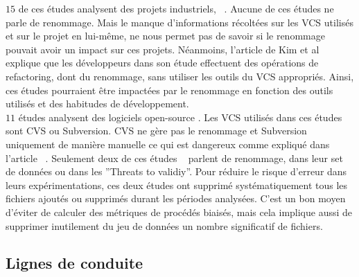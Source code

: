 $15$ de ces études analysent des projets industriels, ~\cite{arisholm_systematic_2010,graves_predicting_2000,khoshgoftaar_using_2000,layman_iterative_2008,munson_code_1998,nagappan_use_2005,nagappan_influence_2008,nagappan_using_2007,nagappan_using_2006,nagappan_change_2010,nikora_building_2006,ostrand_programmer-based_2010,weyuker_too_2008,weyuker_using_2007,yuan_application_2000}. Aucune de ces études ne parle de renommage. Mais le manque d'informations récoltées sur les VCS utilisés et sur le projet en lui-même, ne nous permet pas de savoir si le renommage pouvait avoir un impact sur ces projets. Néanmoins, l'article de Kim et al ~\cite{kim_field_2012} explique que les développeurs dans son étude effectuent des opérations de refactoring, dont du renommage, sans utiliser les outils du VCS appropriés. Ainsi, ces études pourraient être impactées par le renommage en fonction des outils utilisés et des habitudes de développement.\\

$11$ études analysent des logiciels open-source \cite{dambros_relationship_2009,bacchelli_are_2010,caglayan_merits_2009,dambros_evaluating_2012,dambros_evaluating_2012,dambros_extensive_2010,illes-seifert_exploring_2010,li_finding_2005,matsumoto_analysis_2010,moser_analysis_2008,moser_comparative_2008,schroter_if_2006}. Les VCS utilisés dans ces études sont CVS ou Subversion. CVS ne gère pas le renommage et Subversion uniquement de manière manuelle ce qui est dangereux comme expliqué dans l'article ~\cite{lavoie_inferring_2012,steidl_incremental_2014}. Seulement deux de ces études ~\cite{moser_analysis_2008,moser_comparative_2008} parlent de renommage, dans leur set de données ou dans les ''Threats to validiy''. Pour réduire le risque d'erreur dans leurs expérimentations, ces deux études ont supprimé systématiquement tous les fichiers ajoutés ou supprimés durant les périodes analysées. C'est un bon moyen d'éviter de calculer des métriques de procédés biaisés, mais cela implique aussi de supprimer inutilement du jeu de données un nombre significatif de fichiers.\\

\subsection{Lignes de conduite}
\label{sec:guidelines}

